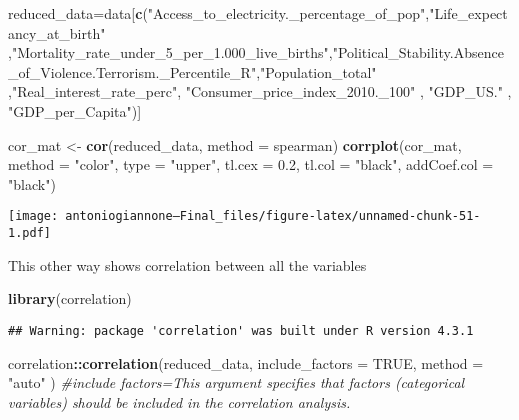 \documentclass[
]{article}
\newenvironment{Shaded}{\begin{snugshade}}{\end{snugshade}}
\newcommand{\AttributeTok}[1]{\textcolor[rgb]{0.13,0.29,0.53}{#1}}
\newcommand{\CommentTok}[1]{\textcolor[rgb]{0.56,0.35,0.01}{\textit{#1}}}
\newcommand{\ConstantTok}[1]{\textcolor[rgb]{0.56,0.35,0.01}{#1}}
\newcommand{\FloatTok}[1]{\textcolor[rgb]{0.00,0.00,0.81}{#1}}
\newcommand{\FunctionTok}[1]{\textcolor[rgb]{0.13,0.29,0.53}{\textbf{#1}}}
\newcommand{\NormalTok}[1]{#1}
\newcommand{\OtherTok}[1]{\textcolor[rgb]{0.56,0.35,0.01}{#1}}
\newcommand{\SpecialCharTok}[1]{\textcolor[rgb]{0.81,0.36,0.00}{\textbf{#1}}}
\newcommand{\StringTok}[1]{\textcolor[rgb]{0.31,0.60,0.02}{#1}}
\begin{document}
\begin{Shaded}
\begin{Highlighting}[]
\NormalTok{reduced\_data}\OtherTok{=}\NormalTok{data[}\FunctionTok{c}\NormalTok{(}\StringTok{"Access\_to\_electricity.\_percentage\_of\_pop"}\NormalTok{,}\StringTok{"Life\_expectancy\_at\_birth"}\NormalTok{  ,}\StringTok{"Mortality\_rate\_under\_5\_per\_1.000\_live\_births"}\NormalTok{,}\StringTok{"Political\_Stability.Absence\_of\_Violence.Terrorism.\_Percentile\_R"}\NormalTok{,}\StringTok{"Population\_total"}\NormalTok{ ,}\StringTok{"Real\_interest\_rate\_perc"}\NormalTok{, }\StringTok{"Consumer\_price\_index\_2010.\_100"}\NormalTok{ , }\StringTok{"GDP\_US."}\NormalTok{ , }\StringTok{"GDP\_per\_Capita"}\NormalTok{)]}
\end{Highlighting}
\end{Shaded}

\begin{Shaded}
\begin{Highlighting}[]
\NormalTok{cor\_mat }\OtherTok{\textless{}{-}} \FunctionTok{cor}\NormalTok{(reduced\_data, }\AttributeTok{method =} \StringTok{\textquotesingle{}spearman\textquotesingle{}}\NormalTok{)}
\FunctionTok{corrplot}\NormalTok{(cor\_mat, }\AttributeTok{method =} \StringTok{"color"}\NormalTok{, }\AttributeTok{type =} \StringTok{"upper"}\NormalTok{, }\AttributeTok{tl.cex =} \FloatTok{0.2}\NormalTok{, }\AttributeTok{tl.col =} \StringTok{"black"}\NormalTok{, }\AttributeTok{addCoef.col =} \StringTok{"black"}\NormalTok{)}
\end{Highlighting}
\end{Shaded}

\texttt{[image: antoniogiannone---Final\_files/figure-latex/unnamed-chunk-51-1.pdf]}

This other way shows correlation between all the variables

\begin{Shaded}
\begin{Highlighting}[]
\FunctionTok{library}\NormalTok{(correlation)}
\end{Highlighting}
\end{Shaded}

\begin{verbatim}
## Warning: package 'correlation' was built under R version 4.3.1
\end{verbatim}

\begin{Shaded}
\begin{Highlighting}[]
\NormalTok{correlation}\SpecialCharTok{::}\FunctionTok{correlation}\NormalTok{(reduced\_data,}
  \AttributeTok{include\_factors =} \ConstantTok{TRUE}\NormalTok{, }\AttributeTok{method =} \StringTok{"auto"}
\NormalTok{) }\CommentTok{\#include factors=This argument specifies that factors (categorical variables) should be included in the correlation analysis.}
\end{Highlighting}
\end{Shaded}
\end{document}
